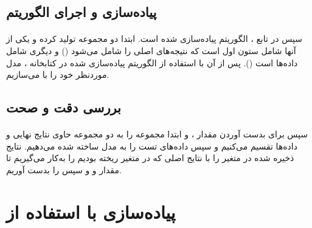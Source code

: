 \documentclass[a4paper,12pt]{article}
\begin{document}
\subsection{پیاده‌سازی و اجرای الگوریتم}
\paragraph{}
سپس در تابع ، الگوریتم  پیاده‌سازی شده است. ابتدا دو مجموعه تولید کرده و یکی از آنها شامل ستون اول است که نتیجه‌های اصلی را شامل می‌شود () و دیگری شامل داده‌ها است (). پس از آن با استفاده از الگوریتم  پیاده‌سازی شده در کتابخانه ، مدل موردنظر خود را با  می‌سازیم.
	
\subsection{بررسی دقت و صحت}
\paragraph{}
سپس برای بدست آوردن مقدار ،  و  ابتدا مجموعه  را به دو مجموعه حاوی نتایج نهایی و داده‌ها تقسیم می‌کنیم و سپس داده‌های تست را به مدل ساخته شده می‌دهیم. نتایج ذخیره شده در متغیر  را با نتایج اصلی که در متغیر  ریخته بودیم را به‌کار می‌گیریم تا مقدار  و  و سپس  را بدست آوریم.
\begin{flushleft}
\end{flushleft}

\section{پیاده‌سازی با استفاده از  }
\end{document}
